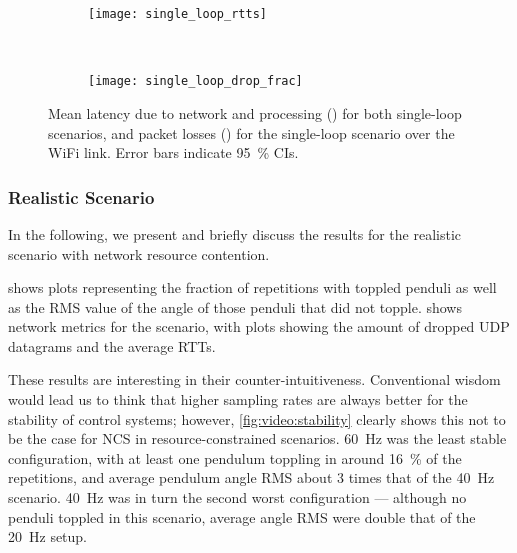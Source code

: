 \begin{figure}
    \centering
    \begin{subfigure}[h]{\columnwidth}
        \centering
        \texttt{[image: single\_loop\_rtts]}
        \caption{}\label{fig:single:rtt}
    \end{subfigure}\\%
    \begin{subfigure}[h]{\columnwidth}
        \centering
        \texttt{[image: single\_loop\_drop\_frac]}
        \caption{}\label{fig:single:drop}
    \end{subfigure}%
    \caption[caption]{Mean latency due to network and processing () for both single-loop scenarios, and packet losses () for the single-loop scenario over the WiFi link.
    Error bars indicate \SI{95}{\percent} \acp{CI}.}%
    \label{fig:single:network}
\end{figure}

\subsubsection{Realistic Scenario}

In the following, we present and briefly discuss the results for the realistic scenario with network resource contention.

 shows plots representing the fraction of repetitions with toppled penduli as well as the \ac{RMS} value of the angle of those penduli that did not topple.
 shows network metrics for the scenario, with plots showing the amount of dropped \ac{UDP} datagrams and the average \acp{RTT}.

These results are interesting in their counter-intuitiveness.
Conventional wisdom would lead us to think that higher sampling rates are always better for the stability of control systems; however, \cref{fig:video:stability} clearly shows this not to be the case for \ac{NCS} in resource-constrained scenarios.
\SI{60}{\hertz} was the least stable configuration, with at least one pendulum toppling in around \SI{16}{\percent} of the repetitions, and average pendulum angle \ac{RMS} about \num{3} times that of the \SI{40}{\hertz} scenario.
\SI{40}{\hertz} was in turn the second worst configuration --- although no penduli toppled in this scenario, average angle \ac{RMS} were double that of the \SI{20}{\hertz} setup.

